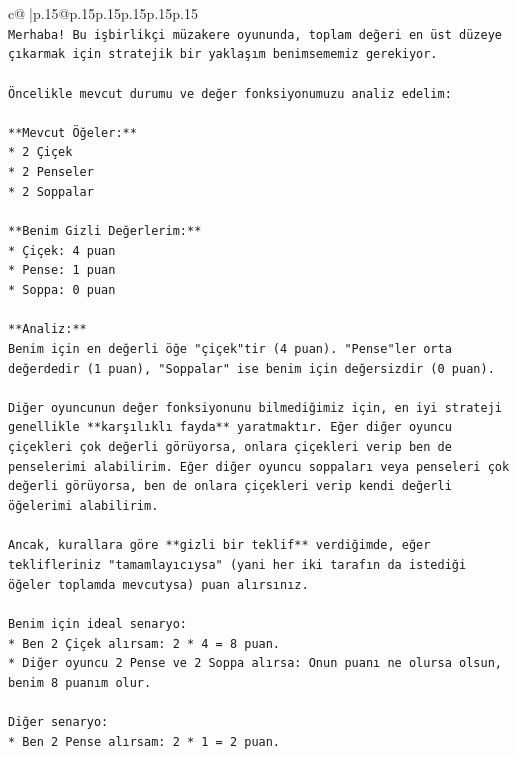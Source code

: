 \documentclass{article}
\begin{document}
{\begin{supertabular}{c@{$\;$}|p{.15\linewidth}@{}p{.15\linewidth}p{.15\linewidth}p{.15\linewidth}p{.15\linewidth}p{.15\linewidth}}
{{{\\ 
\texttt{Merhaba! Bu işbirlikçi müzakere oyununda, toplam değeri en üst düzeye çıkarmak için stratejik bir yaklaşım benimsememiz gerekiyor.} \\
\\ 
\texttt{Öncelikle mevcut durumu ve değer fonksiyonumuzu analiz edelim:} \\
\\ 
\texttt{**Mevcut Öğeler:**} \\
\texttt{*   2 Çiçek} \\
\texttt{*   2 Penseler} \\
\texttt{*   2 Soppalar} \\
\\ 
\texttt{**Benim Gizli Değerlerim:**} \\
\texttt{*   Çiçek: 4 puan} \\
\texttt{*   Pense: 1 puan} \\
\texttt{*   Soppa: 0 puan} \\
\\ 
\texttt{**Analiz:**} \\
\texttt{Benim için en değerli öğe "çiçek"tir (4 puan). "Pense"ler orta değerdedir (1 puan), "Soppalar" ise benim için değersizdir (0 puan).} \\
\\ 
\texttt{Diğer oyuncunun değer fonksiyonunu bilmediğimiz için, en iyi strateji genellikle **karşılıklı fayda** yaratmaktır. Eğer diğer oyuncu çiçekleri çok değerli görüyorsa, onlara çiçekleri verip ben de penselerimi alabilirim. Eğer diğer oyuncu soppaları veya penseleri çok değerli görüyorsa, ben de onlara çiçekleri verip kendi değerli öğelerimi alabilirim.} \\
\\ 
\texttt{Ancak, kurallara göre **gizli bir teklif** verdiğimde, eğer teklifleriniz "tamamlayıcıysa" (yani her iki tarafın da istediği öğeler toplamda mevcutysa) puan alırsınız.} \\
\\ 
\texttt{Benim için ideal senaryo:} \\
\texttt{*   Ben 2 Çiçek alırsam: 2 * 4 = 8 puan.} \\
\texttt{*   Diğer oyuncu 2 Pense ve 2 Soppa alırsa: Onun puanı ne olursa olsun, benim 8 puanım olur.} \\
\\ 
\texttt{Diğer senaryo:} \\
\texttt{*   Ben 2 Pense alırsam: 2 * 1 = 2 puan.} \\
}}}
\end{supertabular}}
\end{document}
